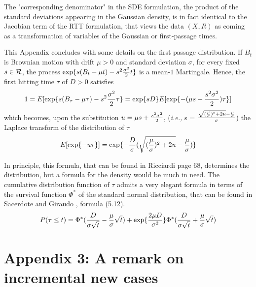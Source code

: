 \documentclass{article}
\begin{document}
The "corresponding denominator" in the SDE formulation, the product of the standard deviations appearing in the Gaussian density, is in fact identical to the Jacobian term of the RTT formulation, that views the data $(X,R)$ as coming as a transformation of variables of the Gaussian or first-passage times.

\bigskip

This Appendix concludes with some details on the first passage distribution. If $B_t$ is Brownian motion with drift $\mu>0$ and standard deviation $\sigma$, for every fixed $s \in {\cal R}$,
\linebreak
the process $\exp\{s (B_t - \mu t) - s^2 {{\sigma^2} \over 2} t\}$ is a mean-$1$ Martingale. Hence, the first hitting time $\tau$ of $D>0$ satisfies
\begin{equation} \label{firstpas1}
1 = E[\exp\{s (B_{\tau} - \mu \tau) - s^2 {{\sigma^2} \over 2} \tau  \}=\exp\{s D\} E[\exp\{-(\mu s +{{s^2 \sigma^2} \over 2})\tau\}]
\end{equation}
which becomes, upon the substitution $u=\mu s+{{s^2 \sigma^2} \over 2}$, (\textit{i.e.,} s = $\frac{\sqrt{({\mu \over \sigma})^2 +2 u}-{\mu \over \sigma}}{\sigma}$) the Laplace transform of the distribution of $\tau$
\begin{equation} \label{firstpas2}
E[\exp\{-u \tau\}]=\exp\{-{D \over \sigma}(\sqrt{({\mu \over \sigma})^2 +2 u}-{\mu \over \sigma})\}
\end{equation}

In principle, this formula, that can be found in Ricciardi \cite{Ricciardi} page 68, determines the distribution, but a formula for the density would be much in need. The cumulative distribution function of $\tau$ admits a very elegant formula in terms of the survival function $\Phi^*$ of the standard normal distribution, that can be found in Sacerdote and Giraudo \cite{Sacerdote}, formula (5.12).
\begin{equation} \label{firstpas3}
P(\tau \le t) = \Phi^*({D \over {\sigma \sqrt{t}}} - {\mu \over \sigma} \sqrt{t}) + \exp\{{{2 \mu D} \over \sigma^2}\} \Phi^*({D \over {\sigma \sqrt{t}}} + {\mu \over \sigma} \sqrt{t})
\end{equation}

\section{Appendix 3: A remark on incremental new cases} \label{More}
\end{document}
